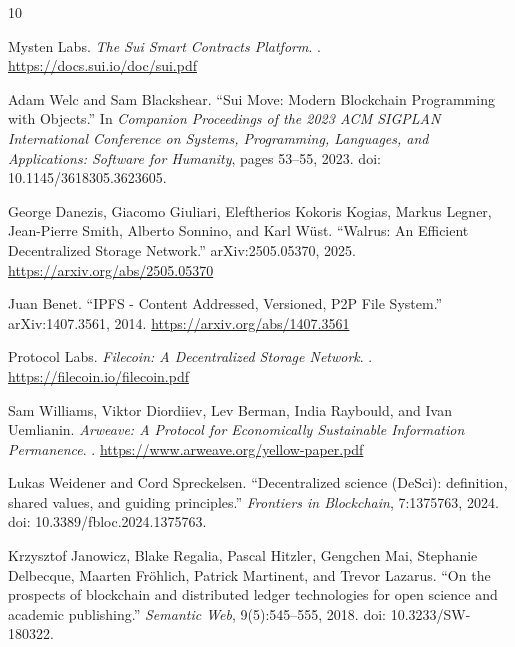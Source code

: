 \documentclass[11pt]{article}
\begin{document}
\begin{thebibliography}{10}

Mysten Labs.
\newblock \emph{The Sui Smart Contracts Platform}.
. \url{https://docs.sui.io/doc/sui.pdf}

Adam Welc and Sam Blackshear.
\newblock ``Sui Move: Modern Blockchain Programming with Objects.''
\newblock In \emph{Companion Proceedings of the 2023 ACM SIGPLAN International Conference on Systems, Programming, Languages, and Applications: Software for Humanity}, pages 53--55, 2023.
\newblock doi: 10.1145/3618305.3623605.

George Danezis, Giacomo Giuliari, Eleftherios Kokoris Kogias, Markus Legner, Jean-Pierre Smith, Alberto Sonnino, and Karl W{\"u}st.
\newblock ``Walrus: An Efficient Decentralized Storage Network.''
\newblock arXiv:2505.05370, 2025. \url{https://arxiv.org/abs/2505.05370}

Juan Benet.
\newblock ``IPFS - Content Addressed, Versioned, P2P File System.''
\newblock arXiv:1407.3561, 2014. \url{https://arxiv.org/abs/1407.3561}

Protocol Labs.
\newblock \emph{Filecoin: A Decentralized Storage Network}.
. \url{https://filecoin.io/filecoin.pdf}

Sam Williams, Viktor Diordiiev, Lev Berman, India Raybould, and Ivan Uemlianin.
\newblock \emph{Arweave: A Protocol for Economically Sustainable Information Permanence}.
. \url{https://www.arweave.org/yellow-paper.pdf}

Lukas Weidener and Cord Spreckelsen.
\newblock ``Decentralized science (DeSci): definition, shared values, and guiding principles.''
\newblock \emph{Frontiers in Blockchain}, 7:1375763, 2024.
\newblock doi: 10.3389/fbloc.2024.1375763.

Krzysztof Janowicz, Blake Regalia, Pascal Hitzler, Gengchen Mai, Stephanie Delbecque, Maarten Fr{\"o}hlich, Patrick Martinent, and Trevor Lazarus.
\newblock ``On the prospects of blockchain and distributed ledger technologies for open science and academic publishing.''
\newblock \emph{Semantic Web}, 9(5):545--555, 2018.
\newblock doi: 10.3233/SW-180322.

\end{thebibliography}
\end{document}
